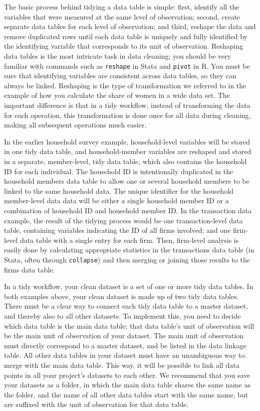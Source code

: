 The basic process behind tidying a data table is simple:
first, identify all the variables that were measured at the same level of observation;
second, create separate data tables for each level of observation;
and third, reshape
the data and remove duplicated rows
until each data table is uniquely and fully identified by the identifying variable
that corresponds to its unit of observation.
Reshaping data tables is the most intricate task in data cleaning;
you should be very familiar with commands such as
\texttt{reshape} in Stata and \texttt{pivot} in R.
You must be sure that identifying variables are consistent across data tables,
so they can always be linked.
Reshaping is the type of transformation we referred to
in the example of how you calculate
the share of women in a wide data set.
The important difference is that
in a tidy workflow,
instead of transforming the data for each operation,
this transformation is done once for all data during cleaning,
making all subsequent operations much easier.

In the earlier household survey example,
household-level variables will be stored in one tidy data table,
and household-member variables are reshaped
and stored in a separate, member-level, tidy data table,
which also contains the household ID for each individual.
The household ID is intentionally duplicated in the household members data table
to allow one or several household members to be linked to the same household data.
The unique identifier for the household member-level data data will be
either a single household member ID or
a combination of household ID and household member ID.
In the transaction data example,
the result of the tidying process would be one transaction-level data table,
containing variables indicating the ID of all firms involved;
and one firm-level data table with a single entry for each firm.
Then, firm-level analysis is easily done
by calculating appropriate statistics in the transactions data table
(in Stata, often through \texttt{collapse})
and then merging or joining those results to the firms data table.

In a tidy workflow, your clean dataset is a set of one or more tidy data tables.
In both examples above, your clean dataset is made up of two tidy data tables.
There must be a clear way to connect each
tidy data table to a master dataset,
and thereby also to all other datasets.
To implement this, you need to decide which data table is the main data table;
that data table's unit of observation will be
the main unit of observation of your dataset.
The main unit of observation must directly correspond to a master dataset,
and be listed in the data linkage table.
All other data tables in your dataset must have
an unambiguous way to merge with the main data table.
This way, it will be possible to link
all data points in all your project's datasets to each other.
We recommend that you save your datasets as a folder,
in which the main data table shares the same name as the folder,
and the name of all other data tables start with the same name,
but are suffixed with the unit of observation for that data table.

